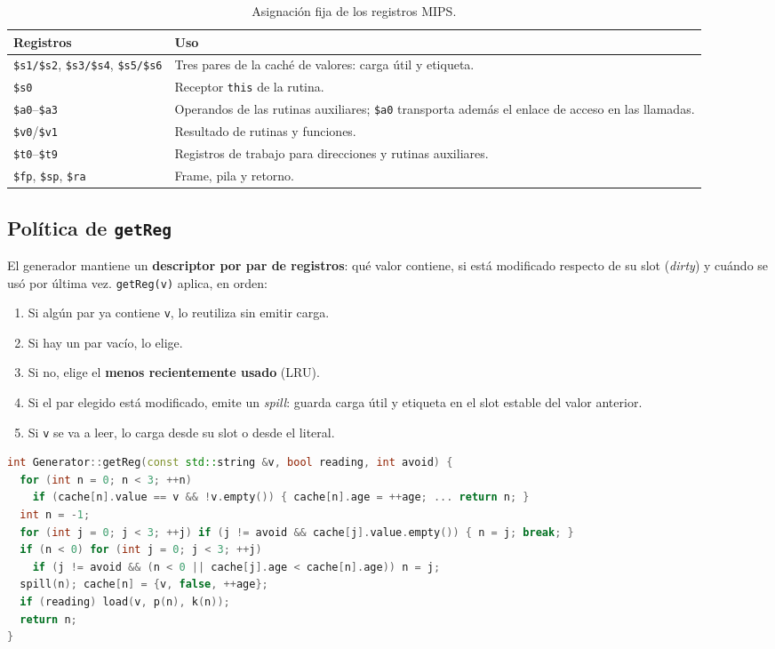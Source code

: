 \documentclass[11pt,a4paper]{article}
\begin{document}
\begin{table}[H]
\centering
\small
\begin{tabular}{@{}L{3.8cm}L{10.4cm}@{}}
\toprule
\textbf{Registros} & \textbf{Uso} \\
\midrule
\texttt{\$s1/\$s2}, \texttt{\$s3/\$s4}, \texttt{\$s5/\$s6} & Tres pares de la
caché de valores: carga útil y etiqueta. \\
\texttt{\$s0} & Receptor \texttt{this} de la rutina. \\
\texttt{\$a0}--\texttt{\$a3} & Operandos de las rutinas auxiliares; \texttt{\$a0}
transporta además el enlace de acceso en las llamadas. \\
\texttt{\$v0}/\texttt{\$v1} & Resultado de rutinas y funciones. \\
\texttt{\$t0}--\texttt{\$t9} & Registros de trabajo para direcciones y rutinas
auxiliares. \\
\texttt{\$fp}, \texttt{\$sp}, \texttt{\$ra} & Frame, pila y retorno. \\
\bottomrule
\end{tabular}
\caption{Asignación fija de los registros MIPS.}
\end{table}

\subsection{Política de \texttt{getReg}}

El generador mantiene un \textbf{descriptor por par de registros}: qué valor
contiene, si está modificado respecto de su slot (\emph{dirty}) y cuándo se usó
por última vez. \texttt{getReg(v)} aplica, en orden:

\begin{enumerate}[leftmargin=1.6em]
  \item Si algún par ya contiene \texttt{v}, lo reutiliza sin emitir carga.
  \item Si hay un par vacío, lo elige.
  \item Si no, elige el \textbf{menos recientemente usado} (LRU).
  \item Si el par elegido está modificado, emite un \emph{spill}: guarda carga
        útil y etiqueta en el slot estable del valor anterior.
  \item Si \texttt{v} se va a leer, lo carga desde su slot o desde el literal.
\end{enumerate}

\begin{lstlisting}[language=C++,caption={Núcleo de \texttt{getReg} en \texttt{mips\_generator.cpp}.}]
int Generator::getReg(const std::string &v, bool reading, int avoid) {
  for (int n = 0; n < 3; ++n)
    if (cache[n].value == v && !v.empty()) { cache[n].age = ++age; ... return n; }
  int n = -1;
  for (int j = 0; j < 3; ++j) if (j != avoid && cache[j].value.empty()) { n = j; break; }
  if (n < 0) for (int j = 0; j < 3; ++j)
    if (j != avoid && (n < 0 || cache[j].age < cache[n].age)) n = j;
  spill(n); cache[n] = {v, false, ++age};
  if (reading) load(v, p(n), k(n));
  return n;
}
\end{lstlisting}
\end{document}
